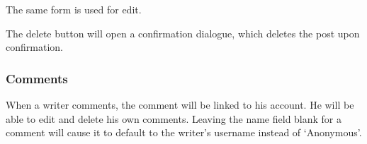 \documentclass[12pt]{article}
\begin{document}
The same form is used for edit.

The delete button will open a confirmation dialogue, which deletes the post upon confirmation.

\subsubsection*{Comments}

When a writer comments, the comment will be linked to his account. He will be able to edit and delete his own comments. Leaving the name field blank for a comment will cause it to default to the writer's username instead of `Anonymous'.
\end{document}

